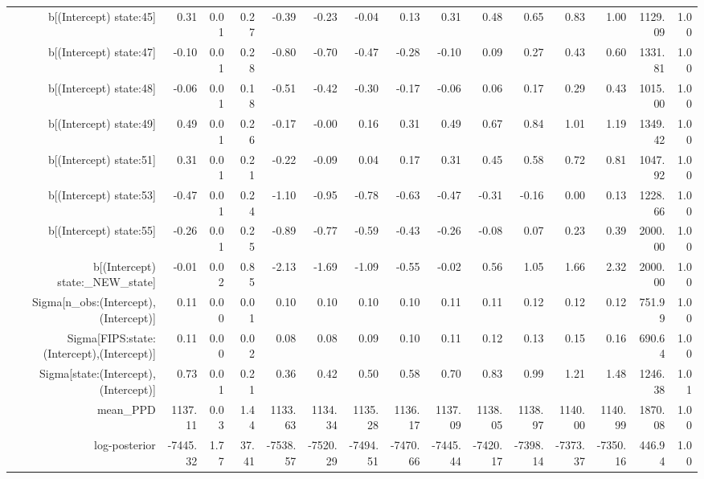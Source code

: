 \begin{table}[ht]
\begin{tabular}{rrrrrrrrrrrrrrr}
  b[(Intercept) state:45] & 0.31 & 0.01 & 0.27 & -0.39 & -0.23 & -0.04 & 0.13 & 0.31 & 0.48 & 0.65 & 0.83 & 1.00 & 1129.09 & 1.00 \\ 
  b[(Intercept) state:47] & -0.10 & 0.01 & 0.28 & -0.80 & -0.70 & -0.47 & -0.28 & -0.10 & 0.09 & 0.27 & 0.43 & 0.60 & 1331.81 & 1.00 \\ 
  b[(Intercept) state:48] & -0.06 & 0.01 & 0.18 & -0.51 & -0.42 & -0.30 & -0.17 & -0.06 & 0.06 & 0.17 & 0.29 & 0.43 & 1015.00 & 1.00 \\ 
  b[(Intercept) state:49] & 0.49 & 0.01 & 0.26 & -0.17 & -0.00 & 0.16 & 0.31 & 0.49 & 0.67 & 0.84 & 1.01 & 1.19 & 1349.42 & 1.00 \\ 
  b[(Intercept) state:51] & 0.31 & 0.01 & 0.21 & -0.22 & -0.09 & 0.04 & 0.17 & 0.31 & 0.45 & 0.58 & 0.72 & 0.81 & 1047.92 & 1.00 \\ 
  b[(Intercept) state:53] & -0.47 & 0.01 & 0.24 & -1.10 & -0.95 & -0.78 & -0.63 & -0.47 & -0.31 & -0.16 & 0.00 & 0.13 & 1228.66 & 1.00 \\ 
  b[(Intercept) state:55] & -0.26 & 0.01 & 0.25 & -0.89 & -0.77 & -0.59 & -0.43 & -0.26 & -0.08 & 0.07 & 0.23 & 0.39 & 2000.00 & 1.00 \\ 
  b[(Intercept) state:\_NEW\_state] & -0.01 & 0.02 & 0.85 & -2.13 & -1.69 & -1.09 & -0.55 & -0.02 & 0.56 & 1.05 & 1.66 & 2.32 & 2000.00 & 1.00 \\ 
  Sigma[n\_obs:(Intercept),(Intercept)] & 0.11 & 0.00 & 0.01 & 0.10 & 0.10 & 0.10 & 0.10 & 0.11 & 0.11 & 0.12 & 0.12 & 0.12 & 751.99 & 1.00 \\ 
  Sigma[FIPS:state:(Intercept),(Intercept)] & 0.11 & 0.00 & 0.02 & 0.08 & 0.08 & 0.09 & 0.10 & 0.11 & 0.12 & 0.13 & 0.15 & 0.16 & 690.64 & 1.00 \\ 
  Sigma[state:(Intercept),(Intercept)] & 0.73 & 0.01 & 0.21 & 0.36 & 0.42 & 0.50 & 0.58 & 0.70 & 0.83 & 0.99 & 1.21 & 1.48 & 1246.38 & 1.01 \\ 
  mean\_PPD & 1137.11 & 0.03 & 1.44 & 1133.63 & 1134.34 & 1135.28 & 1136.17 & 1137.09 & 1138.05 & 1138.97 & 1140.00 & 1140.99 & 1870.08 & 1.00 \\ 
  log-posterior & -7445.32 & 1.77 & 37.41 & -7538.57 & -7520.29 & -7494.51 & -7470.66 & -7445.44 & -7420.17 & -7398.14 & -7373.37 & -7350.16 & 446.94 & 1.00 \\ 
   \hline
\end{tabular}
\end{table}
